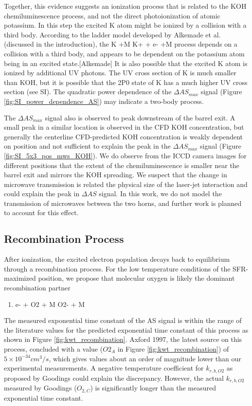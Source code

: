 Together, this evidence suggests an ionization process that is related to the KOH chemiluminescence process, and not the direct photoionization of atomic potassium. In this step the excited K atom might be ionized by a collision with a third body. According to the ladder model developed by Alkemade et al. (discussed in the introduction), the K +M \rightarrow K+ + e- +M process depends on a collision with a third body, and appears to be dependent on the potassium atom being in an excited state.[Alkemade] It is also possible that the excited K atom is ionized by additional UV photons. The UV cross section of K is much smaller than KOH, but it is possible that the 2P0 state of K has a much higher UV cross section (see SI). The quadratic power dependence of the $\Delta AS_{max}$ signal (Figure \ref*{fig:SI_power_dependence_AS}) may indicate a two-body process. 

The $\Delta AS_{max}$ signal also is observed to peak downstream of the barrel exit. A small peak in a similar location is observed in the CFD KOH concentration, but generally the centerline CFD-predicted KOH concentration is weakly dependent on position and not sufficient to explain the peak in the $\Delta AS_{max}$ signal (Figure \ref*{fig:SI_5x3_pos_mws_KOH}). We do observe from the ICCD camera images for different positions that the extent of the chemiluminescence is smaller near the barrel exit and mirrors the KOH spreading. We suspect that the change in microwave transmission is related the physical size of the laser-jet interaction and could explain the peak in $\Delta AS$ signal. In this work, we do not model the transmission of microwaves between the two horns, and further work is planned to account for this effect.

\subsection{Recombination Process}

After ionization, the excited electron population decays back to equilibrium through a recombination process. For the low temperature conditions of the SFR-maximized position, we propose that molecular oxygen is likely the dominant recombination partner

\begin{enumerate}
\item e- + O2 + M \rightarrow O2- + M 
\end{enumerate}

The measured exponential time constant of the AS signal is within the range of the literature values for the predicted exponential time constant of this process as shown in Figure \ref{fig:kwt_recombination}. Axford 1997, the latest source on this process, concluded with a value ($O2_A$ in Figure \ref{fig:kwt_recombination}) of $5 \times 10^{-34} cm^3/s$, which gives values about an order of magnitude lower than our experimental measurements. A negative temperature coefficient for $k_{r,b,O2}$ as proposed by Goodings could explain the discrepancy. However, the actual $k_{r,b,O2}$ measured by Goodings ($O_{2,C}$) is significantly longer than the measured exponential time constant. 

